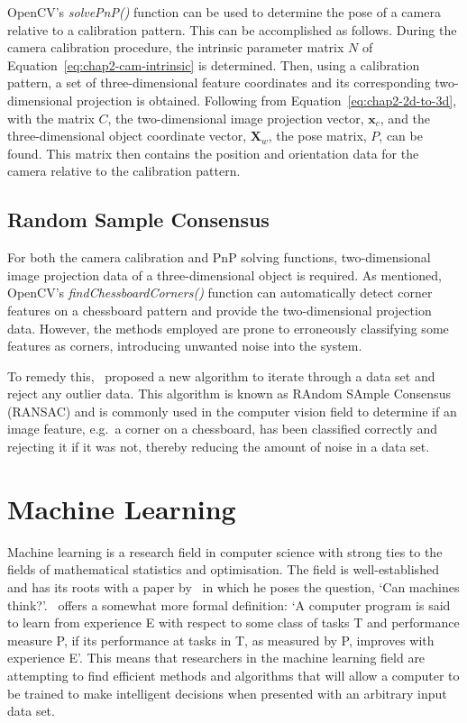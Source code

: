 OpenCV's \emph{solvePnP()} function can be used to determine the pose of a camera relative to a calibration pattern. This can be accomplished as follows. During the camera calibration procedure, the intrinsic parameter matrix $N$ of Equation~\ref{eq:chap2-cam-intrinsic} is determined. Then, using a calibration pattern, a set of three-dimensional feature coordinates and its corresponding two-dimensional projection is obtained. Following from Equation~\ref{eq:chap2-2d-to-3d}, with the matrix $C$, the two-dimensional image projection vector, $\bm{x}_c$, and the three-dimensional object coordinate vector, $\bm{X}_w$, the pose matrix, $P$, can be found. This matrix then contains the position and orientation data for the camera relative to the calibration pattern. 

\subsection{Random Sample Consensus}

For both the camera calibration and PnP solving functions, two-dimensional image projection data of a three-dimensional object is required. As mentioned, OpenCV's \emph{findChessboardCorners()} function can automatically detect corner features on a chessboard pattern and provide the two-dimensional projection data. However, the methods employed are prone to erroneously classifying some features as corners, introducing unwanted noise into the system. 

To remedy this,~\cite{fischler1981random} proposed a new algorithm to iterate through a data set and reject any outlier data. This algorithm is known as RAndom SAmple Consensus (RANSAC) and is commonly used in the computer vision field to determine if an image feature, e.g.\ a corner on a chessboard, has been classified correctly and rejecting it if it was not, thereby reducing the amount of noise in a data set. 

\section{Machine Learning}

Machine learning is a research field in computer science with strong ties to the fields of mathematical statistics and optimisation. The field is well-es\-tab\-lished and has its roots with a paper by~\cite{turing1950computing} in which he poses the question, `Can machines think?'.~\cite{michalski2013machine} offers a somewhat more formal definition: `A computer program is said to learn from experience E with respect to some class of tasks T and performance measure P, if its performance at tasks in T, as measured by P, improves with experience E'. This means that researchers in the machine learning field are attempting to find efficient methods and algorithms that will allow a computer to be trained to make intelligent decisions when presented with an arbitrary input data set. 

